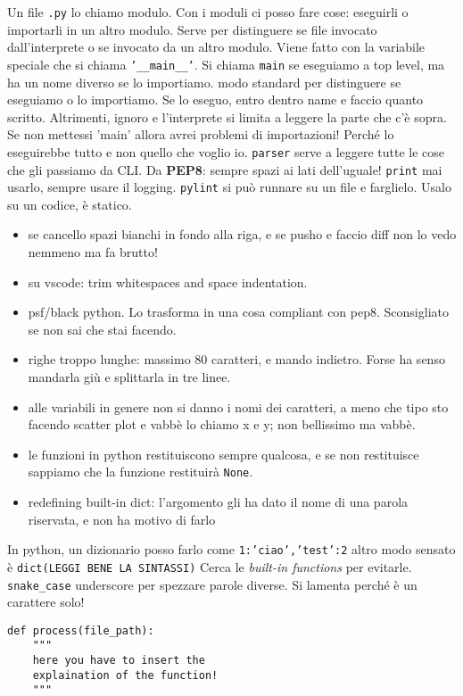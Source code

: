 \documentclass[10pt, a4paper, titlepage]{book}
\begin{document}
Un file \texttt{.py} lo chiamo modulo. Con i moduli ci posso fare cose: eseguirli o importarli in un altro modulo.
Serve per distinguere se file invocato dall'interprete o se invocato da un altro modulo. Viene fatto con la variabile speciale che si chiama \texttt{'__main__'}. 
Si chiama \texttt{main} se eseguiamo a top level, ma ha un nome diverso se lo importiamo.
modo standard per distinguere se eseguiamo o lo importiamo.
Se lo eseguo, entro dentro name e faccio quanto scritto. Altrimenti, ignoro e l'interprete si limita a leggere la parte che c'è sopra.
Se non mettessi 'main' allora avrei problemi di importazioni! Perché lo eseguirebbe tutto e non quello che voglio io.
\texttt{parser} serve a leggere tutte le cose che gli passiamo da  CLI. 
Da \textbf{PEP8}: sempre spazi ai lati dell'uguale!
\texttt{print} mai usarlo, sempre usare il logging.
\texttt{pylint} si può runnare su un file e farglielo. Usalo su un codice, è statico.
\begin{itemize}
	\item se cancello spazi bianchi in fondo alla riga, e se pusho e faccio diff non lo vedo nemmeno ma fa brutto!
	\item su vscode: trim whitespaces and space indentation.
	\item psf/black python. Lo trasforma in una cosa compliant con pep8. Sconsigliato se non sai che stai facendo.
	\item righe troppo lunghe: massimo 80 caratteri, e mando indietro. Forse ha senso mandarla giù e splittarla in tre linee.
	\item alle variabili in genere non si danno i nomi dei caratteri, a meno che tipo sto facendo scatter plot e vabbè lo chiamo x e y; non bellissimo ma vabbè.
	\item le funzioni in python restituiscono sempre qualcosa, e se non restituisce sappiamo che la funzione restituirà \texttt{None}.
	\item redefining built-in dict: l'argomento gli ha dato il nome di una parola riservata, e non ha motivo di farlo
 
\end{itemize}

In python, un dizionario posso farlo come \texttt{{1:'ciao','test':2}}
altro modo sensato è \texttt{dict(LEGGI BENE LA SINTASSI)}
Cerca le \textit{built-in functions} per evitarle.
\texttt{snake\_case} underscore per spezzare parole diverse. Si lamenta perché è un carattere solo!
\begin{verbatim}
def process(file_path):
	"""
	here you have to insert the 
	explaination of the function!
	"""
\end{verbatim}
\end{document}
